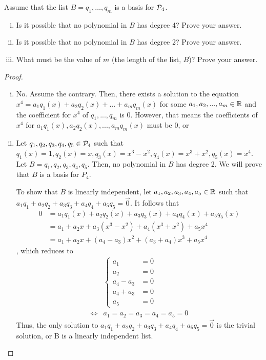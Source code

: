 \begin{question}
	\normalfont
	Assume that the list $B= q_1, \dots, q_m $ \hspace{.1cm} is a basis for $\P_4$.
	\begin{enumerate}[(i)]
		\item Is it possible that no polynomial in $B$ has degree 4? Prove your answer.
		\item Is it possible that no polynomial in $B$ has degree 2? Prove your answer.
		\item What must be the value of $m$ (the length of the list, $B$)?  Prove your answer. \\
	\end{enumerate}
\end{question}
\renewcommand{\qedsymbol}{$\blacksquare$}
\begin{proof}
    \begin{enumerate}[(i)]
        \item No. Assume the contrary. Then, there exists a solution to the equation $x^4=a_1q_1(x)+a_2q_2(x)+...+a_mq_m(x)$ for some $a_1,a_2,...,a_m\in\R$ and the coefficient for $x^4$ of $q_1,...,q_m$ is $0$.
        However, that means the coefficients of $x^4$ for $a_1q_1(x),a_2q_2(x),...,a_mq_m(x)$ must be 0, or 
        \item Let $q_1,q_2,q_3,q_4,q_5\in\P_4$ such that $q_1(x)=1,q_2(x)=x,q_3(x)=x^3-x^2,q_4(x)=x^3+x^2,q_5(x)=x^4$. Let $B=q_1,q_2,q_3,q_4,q_5$. Then, no polynomial in $B$ has degree 2. We will prove that $B$ is a basis for $P_4$.
        
        To show that $B$ is linearly independent, let $a_1,a_2,a_3,a_4,a_5\in\R$ such that $a_1q_1+a_2q_2+a_3q_3+a_4q_4+a_5q_5=\vec{0}$. It follows that 
        \[
            \begin{aligned}
                0
                &= a_1q_1(x)+a_2q_2(x)+a_3q_3(x)+a_4q_4(x)+a_5q_5(x)\\
                &= a_1+a_2x+a_3(x^3-x^2)+a_4(x^3+x^2)+a_5x^4\\
                &= a_1+a_2x+(a_4-a_3)x^2+(a_3+a_4)x^3+a_5x^4
            \end{aligned}
        \]
        , which reduces to
        \begin{align*}
            &\begin{cases}
                a_1 &= 0\\
                a_2 &= 0\\
                a_4-a_3 &= 0\\
                a_4+a_3 &= 0\\
                a_5 &= 0   
            \end{cases}\\\iff
            &a_1=a_2=a_3=a_4=a_5=0
        \end{align*}
        Thus, the only solution to $a_1q_1+a_2q_2+a_3q_3+a_4q_4+a_5q_5=\vec{0}$ is the trivial solution, or B is a linearly independent list.


\end{enumerate}
\end{proof}
